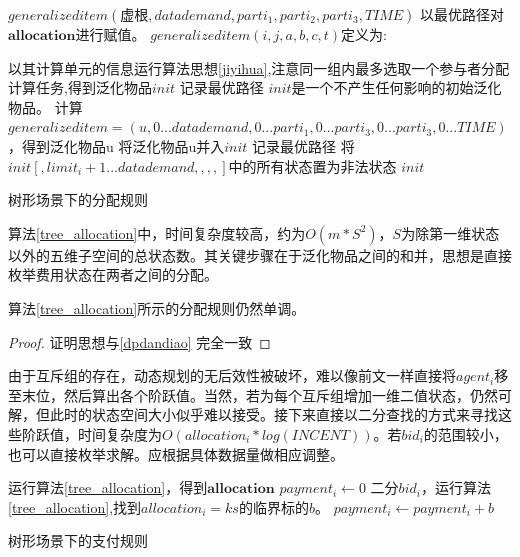 \documentclass[promaster]{thesis-uestc}
\begin{document}
\begin{algorithm}[H]
    $generalizeditem(\text{虚根},datademand,parti_1,parti_2,parti_3,TIME)$\;
    以最优路径对$\mathbf{allocation}$进行赋值。\;
\;
\;
    $generalizeditem(i,j,a,b,c,t)$定义为:\;
    
    {
        以其计算单元的信息运行算法思想\ref{jiyihua},注意同一组内最多选取一个参与者分配计算任务,得到泛化物品$init$\;
        记录最优路径\;
    }{
        $init$是一个不产生任何影响的初始泛化物品。
    }
    {
        计算$generalizeditem=(u,0...datademand,0...parti_1,0...parti_3,0...parti_3,0...TIME)$，得到泛化物品u\;
        将泛化物品u并入$init$\;
        记录最优路径\;
    }
    将$init[,limit_i+1...datademand,,,,]$中的所有状态置为非法状态\;
    \Return $init$\;
\caption{树形场景下的分配规则}
\label{tree_allocation}
\end{algorithm}

算法\ref{tree_allocation}中，时间复杂度较高，约为$O(m*S^2)$，$S$为除第一维状态以外的五维子空间的总状态数。其关键步骤在于泛化物品之间的和并，思想是直接枚举费用状态在两者之间的分配。

\begin{theorem}
 算法\ref{tree_allocation}所示的分配规则仍然单调。 
\end{theorem}

\begin{proof}
证明思想与\ref{dpdandiao} 完全一致
\end{proof}

由于互斥组的存在，动态规划的无后效性被破坏，难以像前文一样直接将$agent_i$移至末位，然后算出各个阶跃值。当然，若为每个互斥组增加一维二值状态，仍然可解，但此时的状态空间大小似乎难以接受。接下来直接以二分查找的方式来寻找这些阶跃值，时间复杂度为$O(allocation_i*log(INCENT))$。若$bid_i$的范围较小，也可以直接枚举求解。应根据具体数据量做相应调整。

\begin{algorithm}[H]
    运行算法\ref{tree_allocation}，得到$\mathbf{allocation}$\;
    {
        $payment_i \leftarrow 0$\;
        {
            二分$bid_i$，运行算法\ref{tree_allocation},找到$allocation_i = ks$的临界标的$b$。
            $payment_i \leftarrow payment_i + b$
        }
    }
\caption{树形场景下的支付规则}
\label{tree_zhifu}
\end{algorithm}
\end{document}
